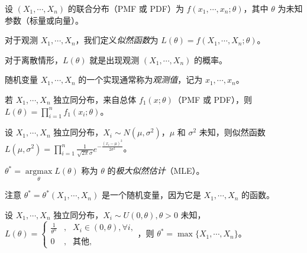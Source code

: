 \documentclass[../main.tex]{subfiles}
\begin{document}
设 $(X_1,\cdots,X_n)$ 的联合分布（PMF 或 PDF）为 $f(x_1,\cdots,x_n;\theta)$，其中 $\theta$ 为未知参数（标量或向量）。

对于观测 $X_1,\cdots,X_n$，我们定义\emph{似然函数}为 $L(\theta)=f(X_1,\cdots,X_n;\theta)$。

对于离散情形，$L(\theta)$ 就是出现观测 $(X_1,\cdots,X_n)$ 的概率。

随机变量 $X_1,\cdots,X_n$ 的一个实现通常称为\emph{观测值}，记为 $x_1,\cdots,x_n$。

若 $X_1,\cdots,X_n$ 独立同分布，来自总体 $f_1(x;\theta)$（PMF 或 PDF），则 $L(\theta)=\prod_{i=1}^nf_1(x_i;\theta)$。

\begin{example}
    设 $X_1,\cdots,X_n$ 独立同分布，$X_i\sim N(\mu,\sigma^2)$，$\mu$ 和 $\sigma^2$ 未知，则似然函数 $L(\mu,\sigma^2)=\prod_{i=1}^n\frac1{\sqrt{2\pi}\sigma}e^{-\frac{(x_i-\mu)^2}{2\sigma^2}}$。
\end{example}

\begin{definition}\label{def:6.2.1}
    $\theta^*=\underset{\theta}{\operatorname{argmax}} L(\theta)$ 称为 $\theta$ 的\emph{极大似然估计}（MLE）。
\end{definition}

注意 $\theta^*=\theta^*(X_1,\cdots,X_n)$ 是一个随机变量，因为它是 $X_1,\cdots,X_n$ 的函数。

\begin{example}
    设 $X_1,\cdots,X_n$ 独立同分布，$X_i\sim U(0,\theta),\theta>0$ 未知，$L(\theta)=\left\{
        \begin{aligned}
            \frac1{\theta^n} & , & X_i\in (0,\theta),\forall i, \\
            0                & , & \text{其他},
        \end{aligned}\right.$，则 $\theta^*=\max\{X_1,\cdots,X_n\}$。
\end{example}
\end{document}
